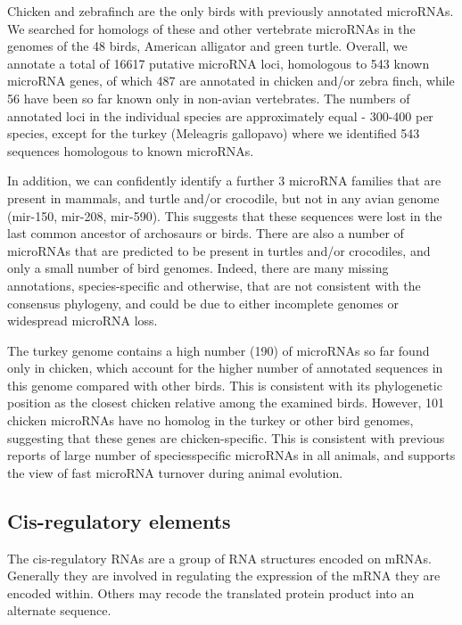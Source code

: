 \documentclass[10pt]{bmc_article}
\newenvironment{bmcformat}{\begin{raggedright}\baselineskip20pt\sloppy\setboolean{publ}{false}}{\end{raggedright}\baselineskip20pt\sloppy}
\begin{document}
\begin{bmcformat}
Chicken and zebrafinch are the only birds with previously annotated
microRNAs. We searched for homologs of these and other vertebrate
microRNAs in the genomes of the 48 birds, American alligator and green
turtle. Overall, we annotate a total of 16617 putative microRNA loci,
homologous to 543 known microRNA genes, of which 487 are annotated in
chicken and/or zebra finch, while 56 have been so far known only in
non-avian vertebrates. The numbers of annotated loci in the individual
species are approximately equal - 300-400 per species, except for the
turkey (Meleagris gallopavo) where we identified 543 sequences
homologous to known microRNAs.

In addition, we can confidently identify a further 3 microRNA
families that are present in mammals, and turtle and/or crocodile, but
not in any avian genome (mir-150, mir-208, mir-590). This suggests
that these sequences were lost in the last common ancestor of
archosaurs or birds. There are also a number of microRNAs that are
predicted to be present in turtles and/or crocodiles, and only a small
number of bird genomes. Indeed, there are many missing annotations,
species-specific and otherwise, that are not consistent with the
consensus phylogeny, and could be due to either incomplete genomes or
widespread microRNA loss.

The turkey genome contains a high number (190) of microRNAs so far
found only in chicken, which account for the higher number of
annotated sequences in this genome compared with other birds. This is
consistent with its phylogenetic position as the closest chicken
relative among the examined birds. However, 101 chicken microRNAs
have no homolog in the turkey or other bird genomes, suggesting that
these genes are chicken-specific. This is consistent with previous
reports of large number of speciesspecific microRNAs in all animals,
and supports the view of fast microRNA turnover during animal
evolution.



\subsection*{Cis-regulatory elements}

The cis-regulatory RNAs are a group of RNA structures encoded on
mRNAs. Generally they are involved in regulating the expression of the
mRNA they are encoded within. Others may recode the translated protein
product into an alternate sequence.


\end{bmcformat}
\end{document}
